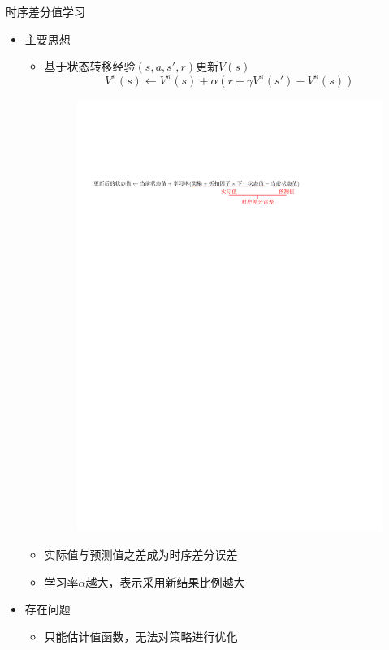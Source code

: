 \begin{note}
    时序差分值学习
    \begin{itemize}
        \item 主要思想
        \begin{itemize}
            \item 基于状态转移经验$(s,a,s',r)$更新$V(s)$
            \[
                V^{\pi}(s)\gets V^{\pi}(s)+\alpha\left(r+ \gamma V^{\pi}(s')-V^{\pi}(s) \right)
            \]
            \begin{figure}[htbp]
                \centering
                \includegraphics[width = .9\textwidth]{image/时序差分值学习思想.pdf}
            \end{figure}
            \item 实际值与预测值之差成为时序差分误差
            \item 学习率$\alpha$越大，表示采用新结果比例越大
        \end{itemize}
        \item 存在问题
        \begin{itemize}
            \item 只能估计值函数，无法对策略进行优化
        \end{itemize}
    \end{itemize}
\end{note}
